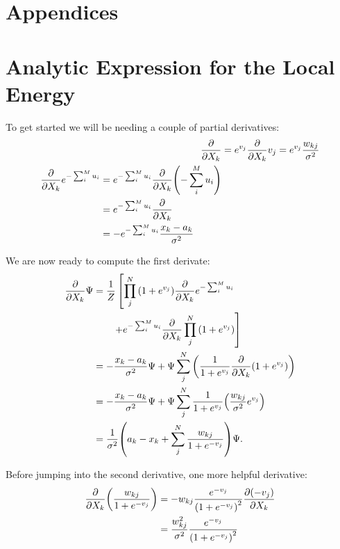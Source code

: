 \documentclass[a4paper, 11pt]{article}
\begin{document}
\pagebreak
\begin{multicols}{2}
    \appendix
    \section*{Appendices}

    \section{Analytic Expression for the Local Energy}
    \label{app:E-L-derivation}

    To get started we will be needing a couple of partial derivatives:
    \begin{align}
        \pdv{}{X_k} (1+e^{v_j}) &=e^{v_j}\pdv{}{X_k}v_j =
        e^{v_j} \frac{w_{kj}}{\sigma^2}\\
        \begin{split}
            \pdv{}{X_k}e^{-\sum_i^M u_i} &= e^{-\sum_i^M
            u_i}\pdv{}{X_k}\qty(-\sum_i^M u_i) \\
            &= e^{-\sum_i^M u_i}\pdv{}{X_k} (-u_k) \\
            &= -e^{-\sum_i^M u_i} \frac{x_k-a_k}{\sigma^2}
        \end{split}
    \end{align}

    We are now ready to compute the first derivate:
    \begin{align*}
        \pdv{}{X_k}\Psi &= \frac{1}{Z} \left[\prod_j^N
        \qty(1+e^{v_j})\pdv{}{X_k}e^{-\sum_i^M u_i}\right.\\
        &\quad{  }\quad{    }\left. + e^{-\sum_i^M
        u_i}\pdv{}{X_k} \prod_j^N \qty(1+e^{v_j})\right]\\
        &= -\frac{x_k-a_k}{\sigma^2}\Psi + \Psi \sum_j^N
        \qty(\frac{1}{1+e^{v_j}}\pdv{}{X_k}\qty(1+e^{v_j}))\\
        &= -\frac{x_k-a_k}{\sigma^2}\Psi + \Psi\sum_j^N
        \frac{1}{1+e^{v_j}}\qty(\frac{w_{kj}}{\sigma^2} e^{v_j})\\
        &= \frac{1}{\sigma^2}\qty(a_k-x_k + \sum_j^N
        \frac{w_{kj}}{1+e^{-v_j}})\Psi.
    \end{align*}

    Before jumping into the second derivative, one more helpful derivative:
    \begin{align}
        \begin{split}
            \pdv{}{X_k}\qty(\frac{w_{kj}}{1+e^{-v_j}}) &=
            -w_{kj}\frac{e^{-v_j}}{\qty(1+e^{-v_j})^2}\pdv{(-v_j)}{X_k}\\
            &= \frac{w_{kj}^2}{\sigma^2} \frac{e^{-v_j}}{\qty(1+e^{-v_j})^2}
        \end{split}
    \end{align}


\end{multicols}
\end{document}
